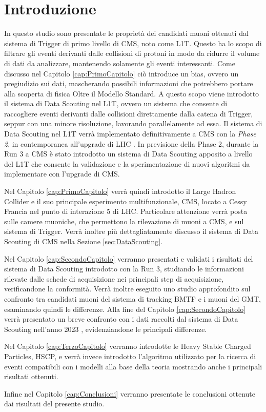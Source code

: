 \chapter{Introduzione}
\label{cap:Introduzione}

In questo studio sono presentate le proprietà dei candidati muoni ottenuti dal sistema di Trigger di primo livello di CMS, noto come L1T. Questo ha lo scopo di filtrare gli eventi derivanti dalle collisioni di protoni in modo da ridurre il volume di dati da analizzare, mantenendo solamente gli eventi interessanti. Come discusso nel Capitolo \ref{cap:PrimoCapitolo} ciò introduce un bias, ovvero un pregiudizio sui dati, mascherando possibili informazioni che potrebbero portare alla scoperta di fisica Oltre il Modello Standard. A questo scopo viene introdotto il sistema di Data Scouting nel L1T, ovvero un sistema che consente di raccogliere eventi derivanti dalle collisioni direttamente dalla catena di Trigger, seppur con una minore risoluzione, lavorando parallelamente ad essa. Il sistema di Data Scouting nel L1T verrà implementato definitivamente a CMS con la \textit{Phase 2}, in contemporanea all'upgrade di LHC . In previsione della Phase 2, durante la Run 3 a CMS è stato introdotto un sistema di Data Scouting apposito a livello del L1T che consente la validazione e la sperimentazione di nuovi algoritmi da implementare con l'upgrade di CMS.


Nel Capitolo \ref{cap:PrimoCapitolo} verrà quindi introdotto il Large Hadron Collider e il suo principale esperimento multifunzionale, CMS, locato a Cessy Francia nel punto di interazione 5 di LHC. Particolare attenzione verrà posta sulle camere muoniche, che permettono la rilevazione di muoni a CMS, e sul sistema di Trigger. Verrà inoltre più dettagliatamente discusso il sistema di Data Scouting di CMS nella Sezione \ref{sec:DataScouting}. 

Nel Capitolo \ref{cap:SecondoCapitolo} verranno presentati e validati i risultati del sistema di Data Scouting introdotto con la Run 3, studiando le informazioni rilevate dalle schede di acquisizione nei principali step di acquisizione, verificandone la conformità. Verrà inoltre eseguito uno studio approfondito sul confronto tra candidati muoni del sistema di tracking BMTF e i muoni del GMT, esaminando quindi le differenze. Alla fine del Capitolo \ref{cap:SecondoCapitolo} verrà presentato un breve confronto con i dati raccolti dal sistema di Data Scouting nell'anno 2023 \cite{CERNsummerSchool}, evidenziandone le principali differenze.

Nel Capitolo \ref{cap:TerzoCapitolo} verranno introdotte le Heavy Stable Charged Particles, HSCP, e verrà invece introdotto l'algoritmo utilizzato per la ricerca di eventi compatibili con i modelli alla base della teoria mostrando anche i principali risultati ottenuti.

Infine nel Capitolo \ref{cap:Conclusioni} verranno presentate le conclusioni ottenute dai risultati del presente studio. 

